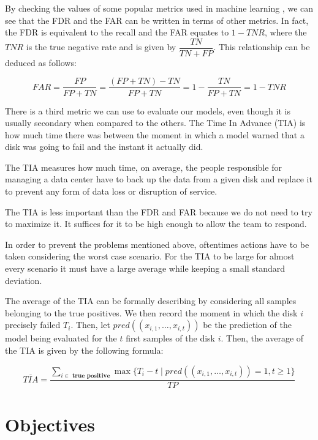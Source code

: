 By checking the values of some popular metrics used in machine learning \cite{olson2008advanced}, we can see that the FDR and the FAR can be written in terms of other metrics.
In fact, the FDR is equivalent to the recall and the FAR equates to $1-TNR$, where the $TNR$ is the true negative rate and is given by $\dfrac{TN}{TN + FP}$.
This relationship can be deduced as follows:

\begin{equation}
  FAR = \dfrac{FP}{FP + TN} = \dfrac{(FP + TN) - TN}{FP + TN} = 1 - \dfrac{TN}{FP + TN} = 1 - TNR 
\end{equation}

There is a third metric we can use to evaluate our models, even though it is usually secondary when compared to the others.
The Time In Advance (TIA) is how much time there was between the moment in which a model warned that a disk was going to fail and the instant it actually did.

The TIA measures how much time, on average, the people responsible for managing a data center have to back up the data from a given disk and replace it to prevent any form of data loss or disruption of service.

The TIA is less important than the FDR and FAR because we do not need to try to maximize it.
It suffices for it to be high enough to allow the team to respond.

In order to prevent the problems mentioned above, oftentimes actions have to be taken considering the worst case scenario.
For the TIA to be large for almost every scenario it must have a large average while keeping a small standard deviation.

The average of the TIA can be formally describing by considering all samples belonging to the true positives.
We then record the moment in which the disk $i$ precisely failed $T_i$.
Then, let $pred((x_{i,1}, \dots ,x_{i,t}))$ be the prediction of the model being evaluated for the $t$ first samples of the disk $i$.
Then, the average of the TIA is given by the following formula:

\begin{equation}
  \overline{TIA} = \dfrac{\sum_{i\in \textbf{ true positive}} \max\{T_i - t \mid pred((x_{i,1},\dots,x_{i,t})) = 1, t \geq 1\}}{TP}
\end{equation}

\section{Objectives}

